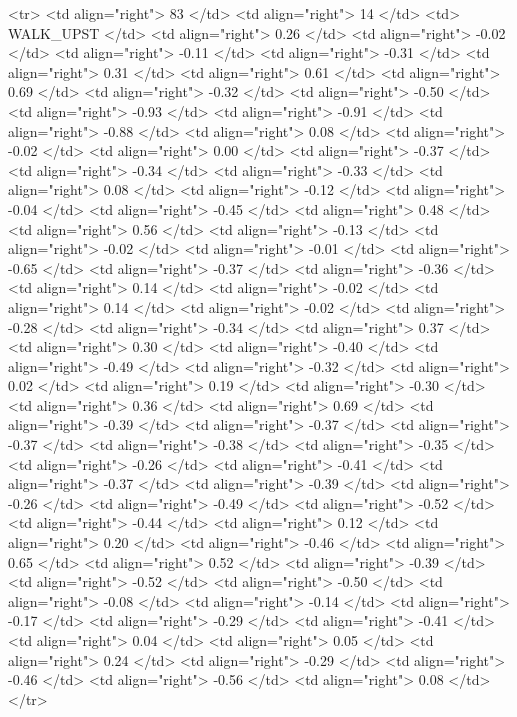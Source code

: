   <tr> <td align="right"> 83 </td> <td align="right">  14 </td> <td> WALK_UPST </td> <td align="right"> 0.26 </td> <td align="right"> -0.02 </td> <td align="right"> -0.11 </td> <td align="right"> -0.31 </td> <td align="right"> 0.31 </td> <td align="right"> 0.61 </td> <td align="right"> 0.69 </td> <td align="right"> -0.32 </td> <td align="right"> -0.50 </td> <td align="right"> -0.93 </td> <td align="right"> -0.91 </td> <td align="right"> -0.88 </td> <td align="right"> 0.08 </td> <td align="right"> -0.02 </td> <td align="right"> 0.00 </td> <td align="right"> -0.37 </td> <td align="right"> -0.34 </td> <td align="right"> -0.33 </td> <td align="right"> 0.08 </td> <td align="right"> -0.12 </td> <td align="right"> -0.04 </td> <td align="right"> -0.45 </td> <td align="right"> 0.48 </td> <td align="right"> 0.56 </td> <td align="right"> -0.13 </td> <td align="right"> -0.02 </td> <td align="right"> -0.01 </td> <td align="right"> -0.65 </td> <td align="right"> -0.37 </td> <td align="right"> -0.36 </td> <td align="right"> 0.14 </td> <td align="right"> -0.02 </td> <td align="right"> 0.14 </td> <td align="right"> -0.02 </td> <td align="right"> -0.28 </td> <td align="right"> -0.34 </td> <td align="right"> 0.37 </td> <td align="right"> 0.30 </td> <td align="right"> -0.40 </td> <td align="right"> -0.49 </td> <td align="right"> -0.32 </td> <td align="right"> 0.02 </td> <td align="right"> 0.19 </td> <td align="right"> -0.30 </td> <td align="right"> 0.36 </td> <td align="right"> 0.69 </td> <td align="right"> -0.39 </td> <td align="right"> -0.37 </td> <td align="right"> -0.37 </td> <td align="right"> -0.38 </td> <td align="right"> -0.35 </td> <td align="right"> -0.26 </td> <td align="right"> -0.41 </td> <td align="right"> -0.37 </td> <td align="right"> -0.39 </td> <td align="right"> -0.26 </td> <td align="right"> -0.49 </td> <td align="right"> -0.52 </td> <td align="right"> -0.44 </td> <td align="right"> 0.12 </td> <td align="right"> 0.20 </td> <td align="right"> -0.46 </td> <td align="right"> 0.65 </td> <td align="right"> 0.52 </td> <td align="right"> -0.39 </td> <td align="right"> -0.52 </td> <td align="right"> -0.50 </td> <td align="right"> -0.08 </td> <td align="right"> -0.14 </td> <td align="right"> -0.17 </td> <td align="right"> -0.29 </td> <td align="right"> -0.41 </td> <td align="right"> 0.04 </td> <td align="right"> 0.05 </td> <td align="right"> 0.24 </td> <td align="right"> -0.29 </td> <td align="right"> -0.46 </td> <td align="right"> -0.56 </td> <td align="right"> 0.08 </td> </tr>
